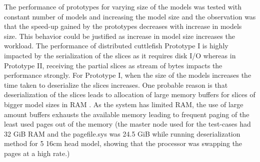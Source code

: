 The performance of prototypes for varying size of the models was tested with constant number of models and increasing the model size and the observation was that the speed-up gained by the prototypes decreases with increase in models size. This behavior could be justified as increase in model size increases the workload. The performance of distributed cuttlefish Prototype I is highly impacted by the serialization of the slices as it requires disk I/O whereas in Prototype II, receiving the partial slices as stream of bytes impacts the performance strongly. For Prototype I, when the size of the models increases the time taken to deserialize the slices increases. One probable reason is that deserialization of the slices leads to allocation of large memory buffers for slices of bigger model sizes in RAM . As the system has limited RAM, the use of large amount buffers exhausts the available memory leading to frequent paging of the least used pages out of the memory (the master node used for the test-cases had 32 GiB RAM and the pagefile.sys was 24.5 GiB while running deserialization method for 5 16cm head model, showing that the processor was swapping the pages at a high rate.)  \newline
